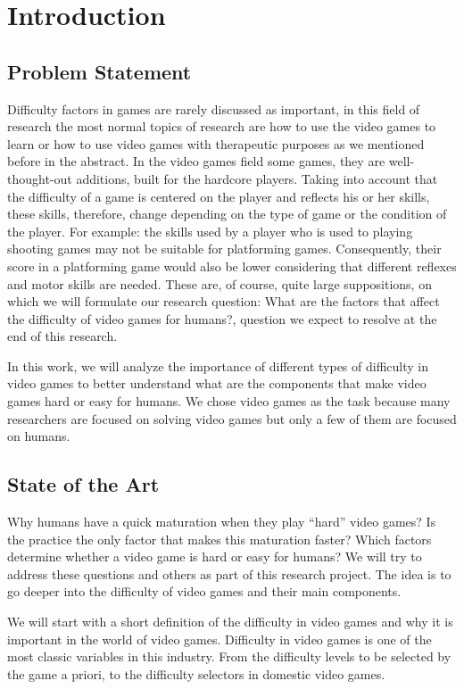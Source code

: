 \normallinespacing

\chapter{Introduction}
\section{Problem Statement}

Difficulty factors in games are rarely discussed as important, in this field of research the most normal topics of research are how to use the video games to learn or how to use video games with therapeutic purposes as we mentioned before in the abstract. In the video games field some games, they are well-thought-out additions, built for the hardcore players. Taking into account that the difficulty of a game is centered on the player and reflects his or her skills, these skills, therefore, change depending on the type of game or the condition of the player. For example: the skills used by a player who is used to playing shooting games may not be suitable for platforming games. Consequently, their score in a platforming game would also be lower considering that different reflexes and motor skills are needed. These are, of course, quite large suppositions, on which we will formulate our research question: What are the factors that affect the difficulty of video games for humans?, question we expect to resolve at the end of this research.

In this work, we will analyze the importance of different types of difficulty in video games to better understand what are the components that make video games hard or easy for humans. We chose video games as the task because many researchers are focused on solving video games but only a few of them are focused on humans. \cite{Dubey2018HumanPriors}

\section{State of the Art}
Why humans have a quick maturation when they play “hard” video games? Is the practice the only factor that makes this maturation faster? Which factors determine whether a video game is hard or easy for humans? We will try to address these questions and others as part of this research project. The idea is to go deeper into the difficulty of video games and their main components.  \cite{Dubey2018HumanPriors}

We will start with a short definition of the difficulty in video games and why it is important in the world of video games. Difficulty in video games is one of the most classic variables in this industry. From the difficulty levels to be selected by the game a priori, to the difficulty selectors in domestic video games.

